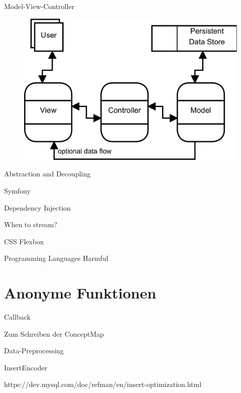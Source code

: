 \newpage 

Model-View-Controller \citep[Seite 176f]{voorhees2020guide}

\begin{figure}[H]
    \centering
    \includegraphics[width=.7\linewidth]{../img/mvc.png}
    \caption{\citep[Seite 177]{voorhees2020guide}}
\end{figure}

Abstraction and Decoupling

Symfony \citep{potencier2022symfony}

Dependency Injection \citep{seemann2019dependency}

When to stream? \citep{braaksma2014streaming}

CSS Flexbox \citep{flexbox-csstricks}

Programming Languages Harmful \citep{janssenscan}

\section{Anonyme Funktionen}

Callback

Zum Schreiben der ConceptMap

Data-Preprocessing

InsertEncoder



https://dev.mysql.com/doc/refman/en/insert-optimization.html





